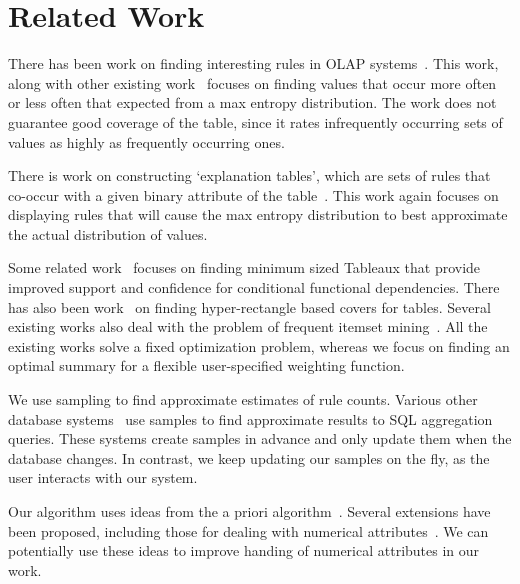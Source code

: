 

\section{Related Work}\label{sec:related}
There has been work on finding interesting rules in OLAP systems~\cite{Sarawagi:2001:UMA:767141.767148, Sarawagi00user-adaptiveexploration, Sarawagi98discovery-drivenexploration}. This work, along with other existing work~\cite{Mampaey:2011:TMI:2020408.2020499} focuses on finding values that occur more often or less often that expected from a max entropy distribution. The work does not guarantee good coverage of the table, since it rates infrequently occurring sets of values as highly as frequently occurring ones. 

There is work on constructing `explanation tables', which are sets of rules that co-occur with a given binary attribute of the table~\cite{DBLP:journals/pvldb/GebalyAGKS14}. This work again focuses on displaying rules that will cause the max entropy distribution to best approximate the actual distribution of values. 

Some related work~\cite{Golab_efficientand, Golab:2008:GNT:1453856.1453900} focuses on finding minimum sized Tableaux that provide improved support and confidence for conditional functional dependencies. There has also been work~\cite{Bu:2005:MSH:1083592.1083644, Lakshmanan:2002:GMA:1287369.1287435, Xiang_succinctsummarization, Geerts04tilingdatabases} on finding hyper-rectangle based covers for tables. Several existing works also deal with the problem of frequent itemset mining~\cite{apriori, 1411744, Han:2000:MFP:342009.335372}. All the existing works solve a fixed optimization problem, whereas  we focus on finding an optimal summary for a flexible user-specified weighting function.

We use sampling to find approximate estimates of rule counts. Various other database systems~\cite{Acharya:1999:AAQ:304182.304581, Agarwal:2013:BQB:2465351.2465355} use samples to find approximate results to SQL aggregation queries. These systems create samples in advance and only update them when the database changes. In contrast, we keep updating our samples on the fly, as the user interacts with our system. 

Our algorithm uses ideas from the a priori algorithm~\cite{apriori}. Several extensions have been proposed, including those for dealing with numerical attributes~\cite{Srikant:1996:MQA:233269.233311, Miller:1997:ARO:253260.253361}. We can potentially use these ideas to improve handing of numerical attributes in our work. 

